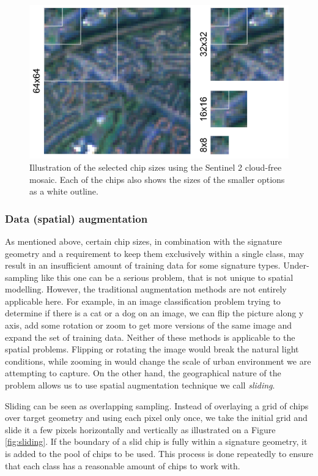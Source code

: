 \begin{figure}
    \centering
    \includegraphics[width=.8\linewidth]{fig/chips.png}
    \caption{Illustration of the selected chip sizes using the Sentinel 2 cloud-free mosaic. Each of the chips also shows the sizes of the smaller options as a white outline.}
    \label{fig:chips}
\end{figure}



\subsubsection{Data (spatial) augmentation}



As mentioned above, certain chip sizes, in combination with the signature geometry and a
requirement to keep them exclusively within a single class, may result in an
insufficient amount of training data for some signature types. Under-sampling like this
one can be a serious problem, that is not unique to spatial modelling. However, the
traditional augmentation methods are not entirely applicable here. For example, in an
image classification problem trying to determine if there is a cat or a dog on an image,
we can flip the picture along y axis, add some rotation or zoom to get more versions of
the same image and expand the set of training data. Neither of these methods is
applicable to the spatial problems. Flipping or rotating the image would break the
natural light conditions, while zooming in would change the scale of urban environment
we are attempting to capture. On the other hand, the geographical nature of the problem
allows us to use spatial augmentation technique we call \textit{sliding}.

Sliding can be seen as overlapping sampling. Instead of overlaying a grid of chips over
target geometry and using each pixel only once, we take the initial grid and slide it a
few pixels horizontally and vertically as illustrated on a Figure \ref{fig:sliding}. If
the boundary of a slid chip is fully within a signature geometry, it is added to the
pool of chips to be used. This process is done repeatedly to ensure that each class has
a reasonable amount of chips to work with.


